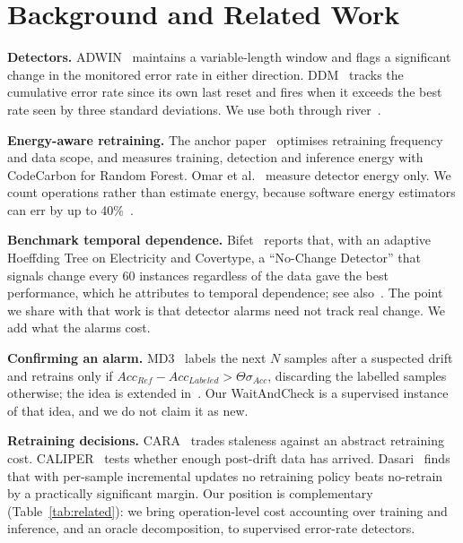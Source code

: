 \documentclass[conference]{IEEEtran}
\begin{document}
\section{Background and Related Work}

\textbf{Detectors.} ADWIN~\cite{adwin2007} maintains a variable-length window and
flags a significant change in the monitored error rate in either direction.
DDM~\cite{ddm2004} tracks the cumulative error rate since its own last reset and
fires when it exceeds the best rate seen by three standard deviations. We use
both through river~\cite{river2021}.

\textbf{Energy-aware retraining.} The anchor paper~\cite{poenaruolaru2025}
optimises retraining frequency and data scope, and measures training, detection
and inference energy with CodeCarbon for Random Forest. Omar et
al.~\cite{omar2024} measure detector energy only. We count operations rather than
estimate energy, because software energy estimators can err by up to
40\%~\cite{fischer2025}.

\textbf{Benchmark temporal dependence.} Bifet~\cite{bifet2017} reports that, with
an adaptive Hoeffding Tree on Electricity and Covertype, a ``No-Change Detector''
that signals change every 60 instances regardless of the data gave the best
performance, which he attributes to temporal dependence; see
also~\cite{bifet2013,zliobaite2013}. The point we share with that work is that
detector alarms need not track real change. We add what the alarms cost.

\textbf{Confirming an alarm.} MD3~\cite{sethi2017} labels the next $N$ samples
after a suspected drift and retrains only if $Acc_{Ref}-Acc_{Labeled} >
\Theta\sigma_{Acc}$, discarding the labelled samples otherwise; the idea is
extended in~\cite{sethi2018}. Our WaitAndCheck is a supervised instance of that
idea, and we do not claim it as new.

\textbf{Retraining decisions.} CARA~\cite{mahadevan2024} trades staleness against
an abstract retraining cost. CALIPER~\cite{caliper2026} tests whether enough
post-drift data has arrived. Dasari~\cite{dasari2026} finds that with per-sample
incremental updates no retraining policy beats no-retrain by a practically
significant margin. Our position is complementary (Table~\ref{tab:related}): we
bring operation-level cost accounting over training and inference, and an oracle
decomposition, to supervised error-rate detectors.
\end{document}

